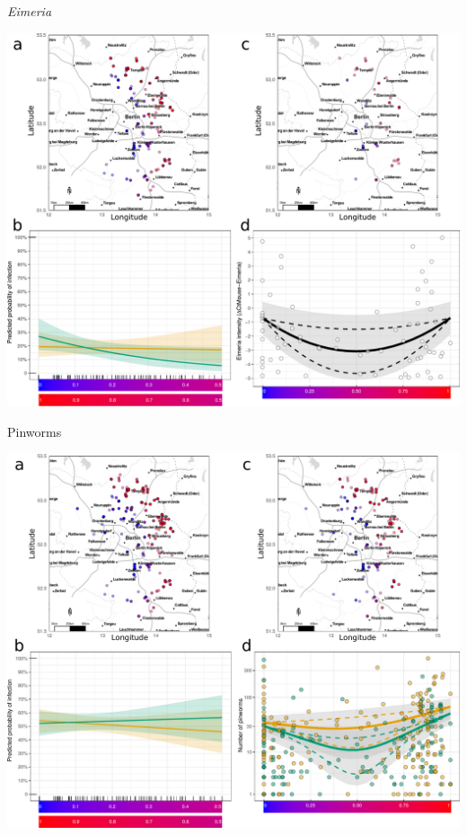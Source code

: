 \documentclass[24pt, a0paper, portrait, margin=5mm, innermargin=5mm,
               blockverticalspace=10mm, blocktitlewidthratio=0.5, colspace=10mm, 
               subcolspace=10mm]{tikzposter}
\begin{document}
      {
      \begin{multicols*}{2}
      
      \begin{multicols*}{2}
\Large \centering \textit{Eimeria}
      \begin{tikzfigure}[]
        \includegraphics[scale=0.7]{Figure2.pdf}
      \end{tikzfigure} \vfill\null \columnbreak


\Large \centering Pinworms
      \begin{tikzfigure}[]
        \includegraphics[scale=0.7]{Figure3.pdf}
      \end{tikzfigure} 


\end{multicols*}
\end{multicols*}}
\end{document}
